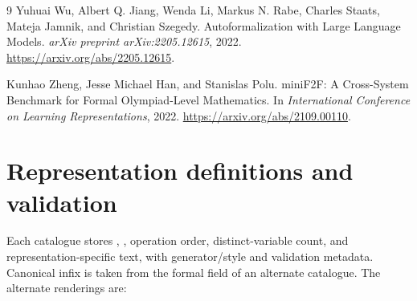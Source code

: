 \documentclass{article}
\newcommand{\code}[1]{\texttt{\detokenize{#1}}}
\begin{document}
\begin{thebibliography}{9}
Yuhuai Wu, Albert Q. Jiang, Wenda Li, Markus N. Rabe, Charles Staats,
Mateja Jamnik, and Christian Szegedy.
\newblock Autoformalization with Large Language Models.
\newblock \emph{arXiv preprint arXiv:2205.12615}, 2022.
\newblock \url{https://arxiv.org/abs/2205.12615}.

Kunhao Zheng, Jesse Michael Han, and Stanislas Polu.
\newblock miniF2F: A Cross-System Benchmark for Formal Olympiad-Level Mathematics.
\newblock In \emph{International Conference on Learning Representations}, 2022.
\newblock \url{https://arxiv.org/abs/2109.00110}.

\end{thebibliography}

\clearpage
\appendix

\section{Representation definitions and validation}
\label{app:representations}

Each catalogue stores \code{node}, \code{formal}, operation order,
distinct-variable count, and representation-specific text, with generator/style
and validation metadata. Canonical infix is taken from the formal field of an
alternate catalogue. The alternate renderings are:
\end{document}
